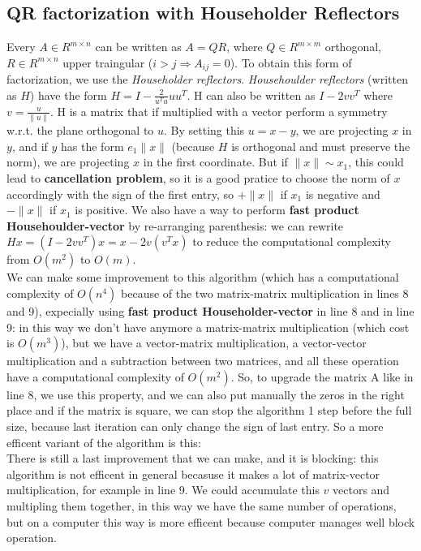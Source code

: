 \documentclass{article}
\begin{document}
\subsection{QR factorization with Householder Reflectors}
Every $A \in R^{m \times n}$ can be written as $A = QR$, where $Q \in R^{m \times m}$ orthogonal, $R \in R^{m \times n}$ upper traingular ($i > j \Rightarrow A_{ij} = 0$).
To obtain this form of factorization, we use the \textit{Householder reflectors}.
\textit{Househoulder reflectors} (written as $H$) have the form $H = I - \frac{2}{u^{T}u}uu^{T}$.
H can also be written as $I - 2vv^{T}$ where $v = \frac{u}{\|u\|}$.
H is a matrix that if multiplied with a vector perform a symmetry w.r.t. the plane orthogonal to $u$.
By setting this $u=x-y$, we are projecting $x$ in $y$, and if $y$ has the form $e_{1}\|x\|$ (because $H$ is orthogonal and must preserve the norm), we are projecting $x$ in the first coordinate.
But if $\|x\| \sim x_{1}$, this could lead to \textbf{cancellation problem}, so it is a good pratice to choose the norm of $x$ accordingly with the sign of the first entry, so $+\|x\|$ if $x_{1}$ is negative and $-\|x\|$ if $x_{1}$ is positive.
We also have a way to perform \textbf{fast product Househoulder-vector} by re-arranging parenthesis: we can rewrite $Hx = (I - 2vv^{T})x = x - 2v(v^{T}x)$ to reduce the computational complexity from $O(m^2)$ to $O(m)$.
\\We can make some improvement to this algorithm (which has a computational complexity of $O(n^4)$ because of the two matrix-matrix multiplication in lines 8 and 9), expecially using \textbf{fast product Householder-vector} in line 8 and in line 9: in this way we don't have anymore a matrix-matrix multiplication (which cost is $O(m^3)$), but we have a vector-matrix multiplication, a vector-vector multiplication and a subtraction between two matrices, and all these operation have a computational complexity of $O(m^2)$. So, to upgrade the matrix A like in line 8, we use this property, and we can also put manually the zeros in the right place and if the matrix is square, we can stop the algorithm 1 step before the full size, because last iteration can only change the sign of last entry. So a more efficent variant of the algorithm is this:
\\There is still a last improvement that we can make, and it is blocking: this algorithm is not efficent in general becasuse it makes a lot of matrix-vector multiplication, for example in line 9. We could accumulate this $v$ vectors and multipling them together, in this way we have the same number of operations, but on a computer this way is more efficent because computer manages well block operation.
\end{document}
